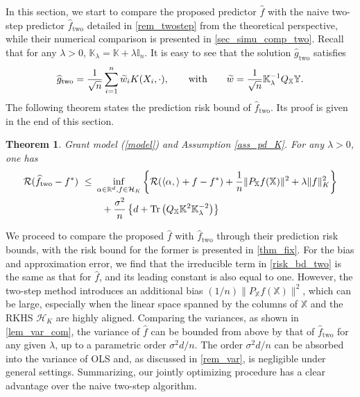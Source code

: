 \documentclass[11pt,twoside]{article}
\newtheorem{theorem}{Theorem}
\def\KK{\mathbb{K}}
\def\II{\mathbb{I}}
\def\YY{\mathbb{Y}}
\def\XX{\mathbb{X}}
\def\RR{\mathbb{R}}
\def\cH{\mathcal H}
\def\cR{\mathcal R}
\def\wh{\widehat}
\def\wt{\widetilde}
\def\tr{{\rm Tr}}
\def\two{\text{two}}
\def\l{\left}
\def\r{\right}
\begin{document}
In this section, we start to compare the proposed predictor $\wh f$ with the naive two-step predictor $\wh f_{\two}$ detailed in \cref{rem_twostep} from the theoretical perspective, while their numerical comparison is presented in \cref{sec_simu_comp_two}. 
Recall that for any $\lambda>0$, $\KK_{\lambda} =\KK +\lambda \II_n$.  It is easy to see that the solution $\wh g_{\two}$ satisfies
\begin{equation}\label{def_g_two} 
        \wh g_{\two} =\frac{1}{\sqrt{n}}\sum_{i=1}^n \wt w_i K(X_i,\cdot), \qquad \text{with} \qquad  \wt w=  {1\over \sqrt n}\KK_{\lambda}^{-1}Q_{\XX} \YY. 
\end{equation}
The following theorem states the prediction risk bound of 
$\wh f_{\two}$. Its proof is given in the end of this section.

\begin{theorem}\label{thm_twostep}
    Grant model (\ref{model}) and
    Assumption   \ref{ass_pd_K}.  For any $\lambda >0$, one has 
    \begin{equation}
        \label{risk_bd_two}
        \begin{aligned}
      \cR(\wh f_{\rm two}-f^*) ~ \le ~    & \inf_{\alpha\in \RR^d, f\in \cH_K}\left\{  \cR(\langle \alpha,\rangle + f- f^*)  +  {1\over n} \|P_{\XX} f(\XX)\|^2+  \lambda \|f\|_K^2  \right\}\\
      & ~~ + {\sigma^2  \over n}\left\{ d +  \tr\l(Q_{\XX} \KK^2 \KK_{\lambda}^{-2} \r)\right\}
\end{aligned}
    \end{equation}
\end{theorem} 



We proceed to compare the proposed $\wh f$ with $\wh f_{\two}$ through their prediction risk bounds, with the risk bound for the former is presented in \cref{thm_fix}. For the bias and approximation error, 
we find that the irreducible term in \eqref{risk_bd_two} is the same as that for  $\wh f$, and   
its leading constant is also equal to one. 
However, the two-step method introduces an additional bias $(1/n) \|P_{\XX} f(\XX)\|^2$, which can be large, especially when the linear space spanned by the columns of $\XX$ and the RKHS $\cH_K$ are highly aligned. Comparing the variances, as shown in \cref{lem_var_com}, the variance of $\wh f$ can be bounded from above by that of $\wh f_{\two}$ for any given $\lambda$, up to a parametric order $ {\sigma^2 d / n}$. The order $ {\sigma^2 d / n}$ can be absorbed into the variance of OLS and, as discussed in \cref{rem_var}, is negligible under general settings. Summarizing, our jointly optimizing procedure has a clear advantage over the naive 
two-step algorithm. \\ 
\end{document}
